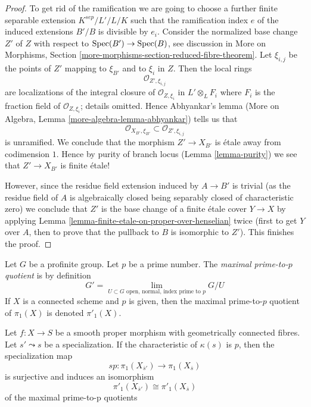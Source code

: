 \begin{proof}
\medskip\noindent
To get rid of the ramification we are going to choose a further finite
separable extension $K^{sep}/L'/L/K$ such that the ramification
index $e$ of the induced extensions $B'/B$ is divisible by $e_i$.
Consider the normalized base change $Z'$ of $Z$ with respect to
$\mathop{\mathrm{Spec}}(B') \to \mathop{\mathrm{Spec}}(B)$, see discussion in
More on Morphisms, Section \ref{more-morphisms-section-reduced-fibre-theorem}.
Let $\xi_{i, j}$ be the points of $Z'$ mapping to $\xi_{B'}$
and to $\xi_i$ in $Z$. Then the local rings
$$
\mathcal{O}_{Z', \xi_{i, j}}
$$
are localizations of the integral closure of $\mathcal{O}_{Z, \xi_i}$
in $L' \otimes_L F_i$ where $F_i$ is the fraction field of
$\mathcal{O}_{Z, \xi_i}$; details omitted. Hence Abhyankar's lemma
(More on Algebra, Lemma \ref{more-algebra-lemma-abhyankar})
tells us that
$$
\mathcal{O}_{X_{B'}, \xi_{B'}} \subset \mathcal{O}_{Z', \xi_{i, j}}
$$
is unramified. We conclude that the morphism $Z' \to X_{B'}$
is \'etale away from codimension $1$. Hence by purity of
branch locus (Lemma \ref{lemma-purity})
we see that $Z' \to X_{B'}$ is finite \'etale!

\medskip\noindent
However, since the residue field extension induced by $A \to B'$
is trivial (as the residue field of $A$ is algebraically closed
being separably closed of characteristic zero)
we conclude that $Z'$ is the base change of a finite \'etale
cover $Y \to X$ by applying
Lemma \ref{lemma-finite-etale-on-proper-over-henselian}
twice (first to get $Y$ over $A$, then to prove that
the pullback to $B$ is isomorphic to $Z'$).
This finishes the proof.
\end{proof}

\noindent
Let $G$ be a profinite group. Let $p$ be a prime number.
The {\it maximal prime-to-$p$ quotient} is by definition
$$
G' = \lim_{U \subset G\text{ open, normal, index prime to }p} G/U
$$
If $X$ is a connected scheme and $p$ is given, then the maximal
prime-to-$p$ quotient of $\pi_1(X)$ is denoted $\pi'_1(X)$.

\begin{theorem}
\label{theorem-specialization-map-isomorphism-prime-to-p}
Let $f : X \to S$ be a smooth proper morphism with geometrically
connected fibres. Let $s' \leadsto s$ be a specialization.
If the characteristic of $\kappa(s)$ is $p$, then the specialization
map
$$
sp : \pi_1(X_{\overline{s}'}) \to \pi_1(X_{\overline{s}})
$$
is surjective and induces an isomorphism
$$
\pi'_1(X_{\overline{s}'}) \cong \pi'_1(X_{\overline{s}})
$$
of the maximal prime-to-p quotients
\end{theorem}

